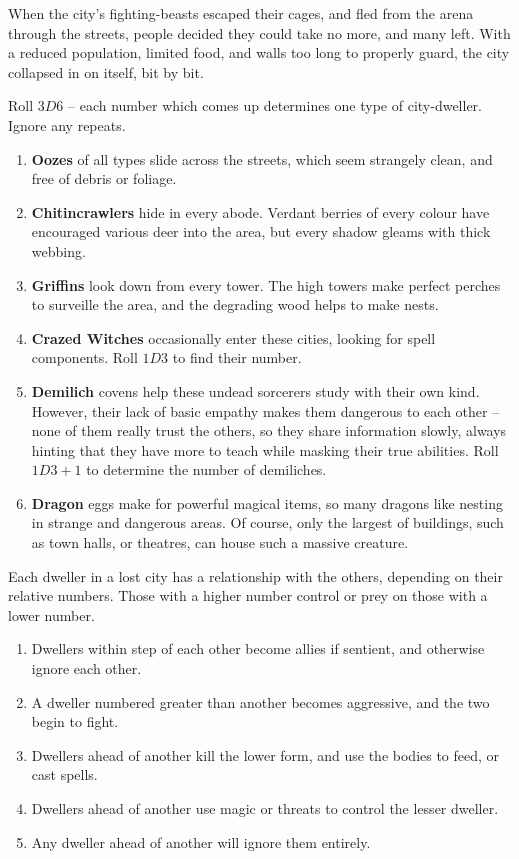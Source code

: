 \begin{multicols}{2}
\begin{enumerate}
  When the city's fighting-beasts escaped their cages, and fled from the arena through the streets, people decided they could take no more, and many left.
  With a reduced population, limited food, and walls too long to properly guard, the city collapsed in on itself, bit by bit.
\end{enumerate}


Roll $3D6$ -- each number which comes up determines one type of city-dweller.
Ignore any repeats.

\begin{enumerate}
  \item
  \textbf{Oozes} of all types slide across the streets, which seem strangely clean, and free of debris or foliage.
  \item
  \textbf{Chitincrawlers} hide in every abode.
  Verdant berries of every colour have encouraged various deer into the area, but every shadow gleams with thick webbing.
  \item
  \textbf{Griffins} look down from every tower.
  The high towers make perfect perches to surveille the area, and the degrading wood helps to make nests.
  \item
  \textbf{Crazed Witches} occasionally enter these cities, looking for spell components.
  Roll $1D3$ to find their number.
  \item
  \textbf{Demilich} covens help these undead sorcerers study with their own kind.
  However, their lack of basic empathy makes them dangerous to each other -- none of them really trust the others, so they share information slowly, always hinting that they have more to teach while masking their true abilities.
  Roll $1D3 + 1$ to determine the number of demiliches.
  \item
  \textbf{Dragon} eggs make for powerful magical items, so many dragons like nesting in strange and dangerous areas.
  Of course, only the largest of buildings, such as town halls, or theatres, can house such a massive creature.
\end{enumerate}


Each dweller in a lost city has a relationship with the others, depending on their relative numbers.
Those with a higher number control or prey on those with a lower number.

\begin{enumerate}
  \item
  Dwellers within  step of each other become allies if sentient, and otherwise ignore each other.
  \item
  A dweller numbered  greater than another becomes aggressive, and the two begin to fight.
  \item
  Dwellers  ahead of another kill the lower form, and use the bodies to feed, or cast spells.
  \item
  Dwellers  ahead of another use magic or threats to control the lesser dweller.
  \item
  Any dweller  ahead of another will ignore them entirely.
\end{enumerate}


\end{multicols}
